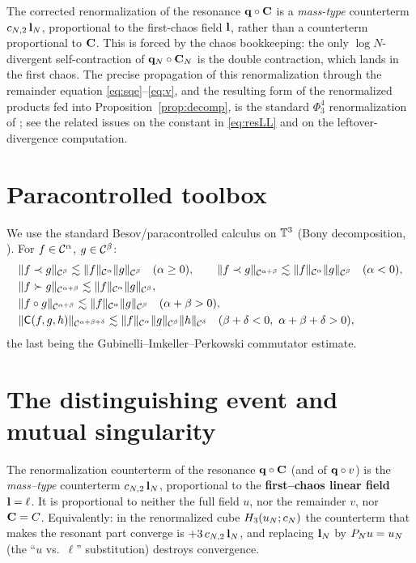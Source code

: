 \begin{remark}
The corrected renormalization of the resonance $\mathbf{q}\circ\mathbf{C}$ is a
\emph{mass-type} counterterm $c_{N,2}\,\mathbf{l}_N$, proportional to the first-chaos
field $\mathbf{l}$, rather than a counterterm proportional to $\mathbf{C}$. This is forced by
the chaos bookkeeping: the only $\log N$-divergent self-contraction of
$\mathbf{q}_N\circ\mathbf{C}_N$ is the double contraction, which lands in the first chaos. The
precise propagation of this renormalization through the remainder equation
\eqref{eq:sqe}--\eqref{eq:v}, and the resulting form of the renormalized products fed
into Proposition~\ref{prop:decomp}, is the standard $\Phi^4_3$ renormalization of
\cite{CC18,MW17b,EW24}; see the related issues on the constant in
\eqref{eq:resLL} and on the leftover-divergence computation.
\end{remark}

\section*{Paracontrolled toolbox}

We use the standard Besov/paracontrolled calculus on $\mathbb{T}^3$ (Bony decomposition,
\cite{BCD11,GIP15}). For $f\in\mathcal{C}^\alpha$, $g\in\mathcal{C}^\beta$:
\begin{align}
&\|f\prec g\|_{\qoneC^{\beta}}\lesssim\|f\|_{\qoneC^{\alpha}}\|g\|_{\qoneC^{\beta}}\quad(\alpha\ge 0),\qquad
\|f\prec g\|_{\qoneC^{\alpha+\beta}}\lesssim\|f\|_{\qoneC^{\alpha}}\|g\|_{\qoneC^{\beta}}\quad(\alpha<0),\label{eq:para1}\\
&\|f\succ g\|_{\qoneC^{\alpha+\beta}}\lesssim\|f\|_{\qoneC^{\alpha}}\|g\|_{\qoneC^{\beta}},\label{eq:para2}\\
&\|f\circ g\|_{\qoneC^{\alpha+\beta}}\lesssim\|f\|_{\qoneC^{\alpha}}\|g\|_{\qoneC^{\beta}}\quad(\alpha+\beta>0),\label{eq:res}\\
&\|\mathsf C(f,g,h)\|_{\qoneC^{\alpha+\beta+\delta}}\lesssim\|f\|_{\qoneC^{\alpha}}\|g\|_{\qoneC^{\beta}}\|h\|_{\qoneC^{\delta}}\quad(\beta+\delta<0,\ \alpha+\beta+\delta>0),\label{eq:comm}
\end{align}
the last being the Gubinelli--Imkeller--Perkowski commutator estimate.

\section*{The distinguishing event and mutual singularity}

\begin{qoneproposition}\label{prop:ctvar}
The renormalization counterterm of the resonance $\mathbf{q}\circ\mathbf{C}$ (and of
$\mathbf{q}\circ v$) is the \emph{mass--type} counterterm $c_{N,2}\,\mathbf{l}_N$,
proportional to the \textbf{first--chaos linear field} $\mathbf{l}=\ell$. It is
proportional to neither the full field $u$, nor the remainder $v$, nor
$\mathbf{C}=C$. Equivalently: in the renormalized cube
$H_3(u_N;c_N)$ the counterterm that makes the resonant part converge is
$+3\,c_{N,2}\,\mathbf{l}_N$, and replacing $\mathbf{l}_N$ by $P_N u=u_N$ (the ``$u$
vs.\ $\ell$'' substitution) destroys convergence.
\end{qoneproposition}

